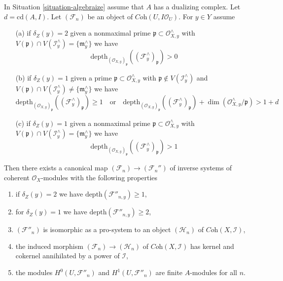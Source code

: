 \begin{lemma}
\label{lemma-improvement-application}
In Situation \ref{situation-algebraize} assume that $A$ has
a dualizing complex. Let $d = \text{cd}(A, I)$. Let $(\mathcal{F}_n)$
be an object of $\textit{Coh}(U, I\mathcal{O}_U)$. For
$y \in Y$ assume
\begin{enumerate}
\item[(a)] if $\delta_Z(y) = 2$ given a nonmaximal prime
$\mathfrak p \subset \mathcal{O}_{X, y}^\wedge$ with
$V(\mathfrak p) \cap V(\mathcal{I}_y^\wedge) = \{\mathfrak m_y^\wedge\}$
we have
$$
\text{depth}_{(\mathcal{O}_{X, y})_\mathfrak p}
((\mathcal{F}^\wedge_y)_\mathfrak p) > 0
$$
\item[(b)] if $\delta_Z(y) = 1$ given a prime
$\mathfrak p \subset \mathcal{O}_{X, y}^\wedge$ with
$\mathfrak p \not \in V(\mathcal{I}_y^\wedge)$
and $V(\mathfrak p) \cap V(\mathcal{I}_y^\wedge) \not =
\{\mathfrak m_y^\wedge\}$ we have
$$
\text{depth}_{(\mathcal{O}_{X, y})_\mathfrak p}
((\mathcal{F}^\wedge_y)_\mathfrak p) \geq 1
\quad\text{or}\quad
\text{depth}_{(\mathcal{O}_{X, y})_\mathfrak p}
((\mathcal{F}^\wedge_y)_\mathfrak p) +
\dim(\mathcal{O}_{X, y}^\wedge/\mathfrak p) > 1 + d
$$
\item[(c)] if $\delta_Z(y) = 1$ given a nonmaximal prime
$\mathfrak p \subset \mathcal{O}_{X, y}^\wedge$ with
$V(\mathfrak p) \cap V(\mathcal{I}_y^\wedge) = \{\mathfrak m_y^\wedge\}$
we have
$$
\text{depth}_{(\mathcal{O}_{X, y})_\mathfrak p}
((\mathcal{F}^\wedge_y)_\mathfrak p) > 1
$$
\end{enumerate}
Then there exists a canonical map $(\mathcal{F}_n) \to (\mathcal{F}_n'')$
of inverse systems of coherent $\mathcal{O}_X$-modules
with the following properties
\begin{enumerate}
\item if $\delta_Z(y) = 2$ we have $\text{depth}(\mathcal{F}''_{n, y}) \geq 1$,
\item for $\delta_Z(y) = 1$ we have $\text{depth}(\mathcal{F}''_{n, y}) \geq 2$,
\item $(\mathcal{F}''_n)$ is isomorphic as a pro-system to an object
$(\mathcal{H}_n)$ of $\textit{Coh}(X, \mathcal{I})$,
\item the induced morphism $(\mathcal{F}_n) \to (\mathcal{H}_n)$ of
$\textit{Coh}(X, \mathcal{I})$ has kernel and cokernel
annihilated by a power of $\mathcal{I}$,
\item the modules $H^0(U, \mathcal{F}''_n)$ and $H^1(U, \mathcal{F}''_n)$
are finite $A$-modules for all $n$.
\end{enumerate}
\end{lemma}

